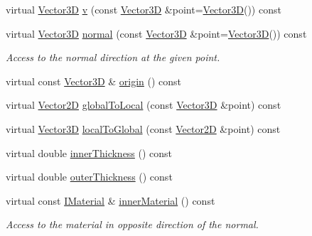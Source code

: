 \begin{DoxyCompactItemize}
\item 
virtual \hyperlink{class_d_d_surfaces_1_1_vector3_d}{Vector3D} \hyperlink{class_d_d4hep_1_1_d_d_rec_1_1_surface_a76edfb105ebae153080713c99a310044}{v} (const \hyperlink{class_d_d_surfaces_1_1_vector3_d}{Vector3D} \&point=\hyperlink{class_d_d_surfaces_1_1_vector3_d}{Vector3D}()) const 
\item 
virtual \hyperlink{class_d_d_surfaces_1_1_vector3_d}{Vector3D} \hyperlink{class_d_d4hep_1_1_d_d_rec_1_1_surface_a1a4f7412be6079af165bb7a3b3e7770c}{normal} (const \hyperlink{class_d_d_surfaces_1_1_vector3_d}{Vector3D} \&point=\hyperlink{class_d_d_surfaces_1_1_vector3_d}{Vector3D}()) const 
\begin{DoxyCompactList}\small\item\em Access to the normal direction at the given point. \item\end{DoxyCompactList}\item 
virtual const \hyperlink{class_d_d_surfaces_1_1_vector3_d}{Vector3D} \& \hyperlink{class_d_d4hep_1_1_d_d_rec_1_1_surface_ad3b8710337ded85b4b277eca2d38cc8a}{origin} () const 
\item 
virtual \hyperlink{class_d_d_surfaces_1_1_vector2_d}{Vector2D} \hyperlink{class_d_d4hep_1_1_d_d_rec_1_1_surface_a3c42b99943d5670d31ee67a90bdbafbd}{globalToLocal} (const \hyperlink{class_d_d_surfaces_1_1_vector3_d}{Vector3D} \&point) const 
\item 
virtual \hyperlink{class_d_d_surfaces_1_1_vector3_d}{Vector3D} \hyperlink{class_d_d4hep_1_1_d_d_rec_1_1_surface_ad5107e6eed2e092460a69530258b4852}{localToGlobal} (const \hyperlink{class_d_d_surfaces_1_1_vector2_d}{Vector2D} \&point) const 
\item 
virtual double \hyperlink{class_d_d4hep_1_1_d_d_rec_1_1_surface_a4efd4a2e74c6435916cef09328cc436c}{innerThickness} () const 
\item 
virtual double \hyperlink{class_d_d4hep_1_1_d_d_rec_1_1_surface_a1f75aae21b3cfc2fca58a8e8a340703e}{outerThickness} () const 
\item 
virtual const \hyperlink{class_d_d_surfaces_1_1_i_material}{IMaterial} \& \hyperlink{class_d_d4hep_1_1_d_d_rec_1_1_surface_a923794ef06f1fb5364e68f60b99b7159}{innerMaterial} () const 
\begin{DoxyCompactList}\small\item\em Access to the material in opposite direction of the normal. \item\end{DoxyCompactList}\item 

\end{DoxyCompactItemize}
